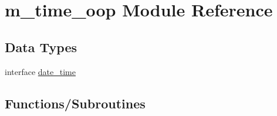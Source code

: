 \hypertarget{namespacem__time__oop}{}\section{m\+\_\+time\+\_\+oop Module Reference}
\label{namespacem__time__oop}
\subsection*{Data Types}
\begin{DoxyCompactItemize}
\item 
interface \hyperlink{structm__time__oop_1_1date__time}{date\+\_\+time}
\end{DoxyCompactItemize}
\subsection*{Functions/\+Subroutines}
